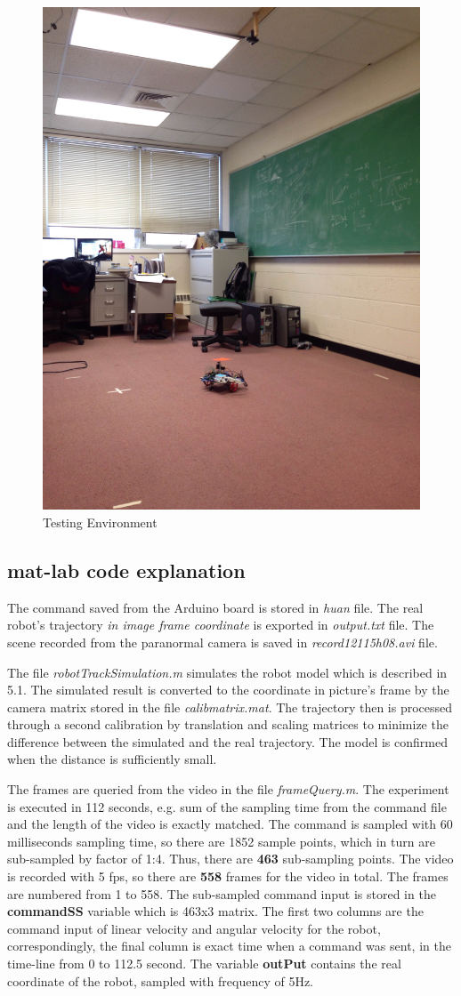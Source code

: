\documentclass[letterpaper, 10 pt, conference]{ieeeconf}
\begin{document}
\begin{figure}
\centering
\includegraphics[width=.7\columnwidth]{testingEnvironment.jpg}
\caption{Testing Environment}
\end{figure}

\subsection{mat-lab code explanation}
The command saved from the Arduino board is stored in \emph{huan} file. The real robot's trajectory \emph{in image frame coordinate} is exported in \emph{output.txt} file. The scene recorded from the paranormal camera is saved in \emph{record12115h08.avi} file.

The file \emph{robotTrackSimulation.m} simulates the robot model which is described in 5.1. The simulated result is converted to the coordinate in picture's frame by the camera matrix stored in the file \emph{calibmatrix.mat}. The trajectory then is processed through a second calibration by translation and scaling matrices to minimize the difference between the simulated and the real trajectory. The model is confirmed when the distance is sufficiently small.

The frames are queried from the video in the file \emph{frameQuery.m}. The experiment is executed in 112 seconds, e.g. sum of the sampling time from the command file and the length of the video is exactly matched. The command is sampled with 60 milliseconds sampling time, so there are 1852 sample points, which in turn are sub-sampled by factor of 1:4. Thus, there are \textbf{463} sub-sampling points. The video is recorded with 5 fps, so there are \textbf{558} frames for the video in total. The frames are numbered from 1 to 558. The sub-sampled command input is stored in the \textbf{commandSS} variable which is 463x3 matrix. The first two columns are the command input of linear velocity and angular velocity for the robot, correspondingly, the final column is exact time when a command was sent, in the time-line from 0 to 112.5 second. The variable \textbf{outPut} contains the real coordinate of the robot, sampled with frequency of 5Hz.  
\end{document}
